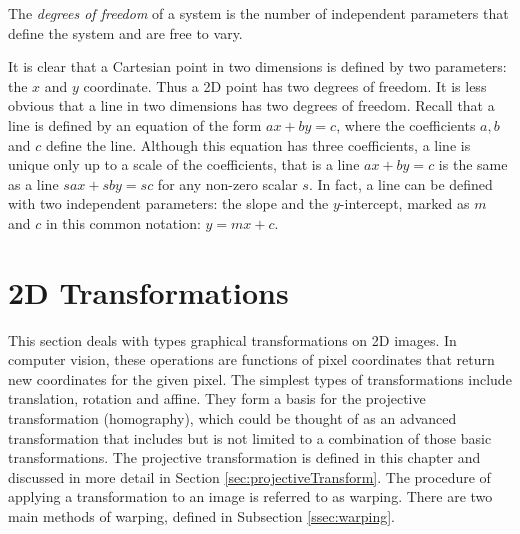 \documentclass[11pt, oneside, reqno]{book}
\begin{document}
\begin{definition}
	The \textit{degrees of freedom} of a system is the number of independent parameters that define the system and are free to vary.
\end{definition}

\begin{example}
	 It is clear that a Cartesian point in two dimensions is defined by two parameters: the $x$ and $y$ coordinate. Thus a 2D point has two degrees of freedom. It is less obvious that a line in two dimensions has two degrees of freedom. Recall that a line is defined by an equation of the form $ax + by = c$, where the coefficients $a, b$ and $c$ define the line. Although this equation has three coefficients, a line is unique only up to a scale of the coefficients, that is a line $ax + by = c$ is the same as a line $sax + sby = sc$ for any non-zero scalar $s$. In fact, a line can be defined with two independent parameters: the slope and the $y$-intercept, marked as $m$ and $c$ in this common notation: $y = mx + c$.
\end{example}








\section{2D Transformations}
\label{sec:2DTransform}

This section deals with types graphical transformations on 2D images. In computer vision, these operations are functions of pixel coordinates that return new coordinates for the given pixel. The simplest types of transformations include translation, rotation and affine. They form a basis for the projective transformation (homography), which could be thought of as an advanced transformation that includes but is not limited to a combination of those basic transformations. The projective transformation is defined in this chapter and discussed in more detail in Section \ref{sec:projectiveTransform}. The procedure of applying a transformation to an image is referred to as warping. There are two main methods of warping, defined in Subsection \ref{ssec:warping}.

\end{document}
